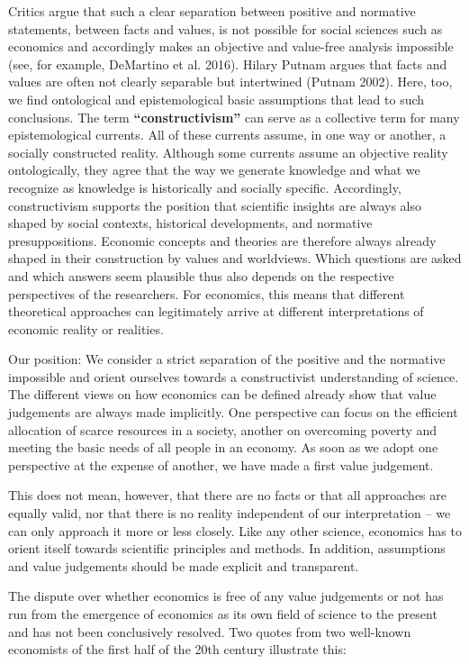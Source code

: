 \documentclass[
  british,
  a4paper,
  DIV=11,
  numbers=noendperiod,
  oneside,
  openany]{scrreprt}
\begin{document}
Critics argue that such a clear separation between positive and
normative statements, between facts and values, is not possible for
social sciences such as economics and accordingly makes an objective and
value-free analysis impossible (see, for example, DeMartino et al.
2016). Hilary Putnam argues that facts and values are often not clearly
separable but intertwined (Putnam 2002). Here, too, we find ontological
and epistemological basic assumptions that lead to such conclusions. The
term \textbf{``constructivism''} can serve as a collective term for many
epistemological currents. All of these currents assume, in one way or
another, a socially constructed reality. Although some currents assume
an objective reality ontologically, they agree that the way we generate
knowledge and what we recognize as knowledge is historically and
socially specific. Accordingly, constructivism supports the position
that scientific insights are always also shaped by social contexts,
historical developments, and normative presuppositions. Economic
concepts and theories are therefore always already shaped in their
construction by values and worldviews. Which questions are asked and
which answers seem plausible thus also depends on the respective
perspectives of the researchers. For economics, this means that
different theoretical approaches can legitimately arrive at different
interpretations of economic reality or realities.

Our position: We consider a strict separation of the positive and the
normative impossible and orient ourselves towards a constructivist
understanding of science. The different views on how economics can be
defined already show that value judgements are always made implicitly.
One perspective can focus on the efficient allocation of scarce
resources in a society, another on overcoming poverty and meeting the
basic needs of all people in an economy. As soon as we adopt one
perspective at the expense of another, we have made a first value
judgement.

This does not mean, however, that there are no facts or that all
approaches are equally valid, nor that there is no reality independent
of our interpretation -- we can only approach it more or less closely.
Like any other science, economics has to orient itself towards
scientific principles and methods. In addition, assumptions and value
judgements should be made explicit and transparent.

The dispute over whether economics is free of any value judgements or
not has run from the emergence of economics as its own field of science
to the present and has not been conclusively resolved. Two quotes from
two well-known economists of the first half of the 20th century
illustrate this:
\end{document}
